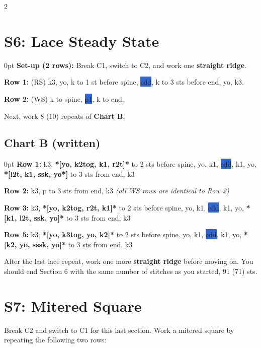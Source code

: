 \documentclass[12pt]{article}
\newcommand{\rowDir}[1]{\hspace{-2em} \textbf{#1:}} %
\newcommand{\spine}[1]{\colorbox{highlight}{#1}} %
\newenvironment{frdirection}
    {%
	\def\FrameCommand{\fboxrule=\FrameRule\fboxsep=\FrameSep \fbox}
   	\MakeFramed {\advance\hsize-\width \FrameRestore}
    	\addmargin[2em]{0pt}}
    {\endaddmargin
	\endMakeFramed}
\newenvironment{unframed}
    {%
	\begin{addmargin}[1cm]{0pt}}
    {	\end{addmargin}}
\begin{document}
\begin{multicols}{2}

\section*{S6: Lace Steady State}
\begin{unframed} \rowDir{Set-up (2 rows)} Break C1, switch to C2, and work one \textbf{straight ridge}. \end{unframed}

\begin{frdirection}
\rowDir{Row 1} (RS) k3, yo, k to 1 st before spine, \spine{cdd},  k to 3 sts before end, yo, k3.

\rowDir{Row 2} (WS) k to spine, \spine{p1}, k to end.
\end{frdirection}

Next, work 8 (10) repeats of \textbf{Chart B}. 

\subsection*{Chart B (written)}

\begin{unframed}
\rowDir{Row 1} k3, \textbf{*[yo, k2tog, k1, r2t]*} to 2 sts before spine, yo, k1, \spine{cdd}, k1, yo, \textbf{*[l2t, k1, ssk, yo*]} to 3 sts from end, k3 

\rowDir{Row 2} k3, p to 3 sts from end, k3 \emph{(all WS rows are identical to Row 2)}

\rowDir{Row 3} k3, \textbf{*[yo, k2tog, r2t, k1]*} to 2 sts before spine, yo, k1, \spine{cdd}, k1, yo, \textbf{*[k1, l2t, ssk, yo]*} to 3 sts from end, k3

\rowDir{Row 5} k3, \textbf{*[yo, k3tog, yo, k2]*} to 2 sts before spine, yo, k1, \spine{cdd}, k1, yo, \textbf{*[k2, yo, sssk, yo]*} to 3 sts from end, k3
\end{unframed}

After the last lace repeat, work one more \textbf{straight ridge} before moving on. You should end Section 6 with the same number of stitches as you started, 91 (71) sts.

\vfill
\columnbreak

\section*{S7: Mitered Square}

Break C2 and switch to C1 for this last section. Work a mitered square by repeating the following two rows:


\end{multicols}
\end{document}
